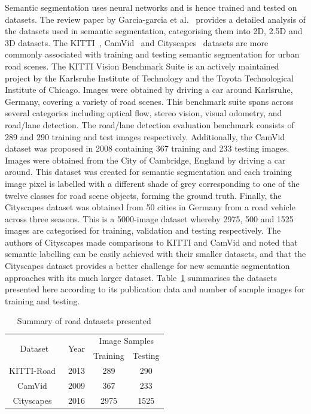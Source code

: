 Semantic segmentation uses neural networks and is hence trained and tested on datasets. The review paper by Garcia-garcia et al.~\cite{garcia-garcia_review_2017} provides a detailed analysis of the datasets used in semantic segmentation, categorising them into 2D, 2.5D and 3D datasets. The KITTI~\cite{geiger_are_2012}, CamVid~\cite{brostow_semantic_2009} and Cityscapes~\cite{cordts_cityscapes_2016} datasets are more commonly associated with training and testing semantic segmentation for urban road scenes. The KITTI Vision Benchmark Suite is an actively maintained project by the Karlsruhe Institute of Technology and the Toyota Technological Institute of Chicago. Images were obtained by driving a car around Karlsruhe, Germany, covering a variety of road scenes. This benchmark suite spans across several categories including optical flow, stereo vision, visual odometry, and road/lane detection. The road/lane detection evaluation benchmark consists of 289 and 290 training and test images respectively. Additionally, the CamVid dataset was proposed in 2008 containing 367 training and 233 testing images. Images were obtained from the City of Cambridge, England by driving a car around. This dataset was created for semantic segmentation and each training image pixel is labelled with a different shade of grey corresponding to one of the twelve classes for road scene objects, forming the ground truth. Finally, the Cityscapes dataset was obtained from 50 cities in Germany from a road vehicle across three seasons. This is a 5000-image dataset whereby 2975, 500 and 1525 images are categorised for training, validation and testing respectively. The authors of Cityscapes made comparisons to KITTI and CamVid and noted that semantic labelling can be easily achieved with their smaller datasets, and that the Cityscapes dataset provides a better challenge for new semantic segmentation approaches with its much larger dataset. Table~\ref{tabdatasets} summarises the datasets presented here according to its publication data and number of sample images for training and testing.

\begin{table}[H]
	\renewcommand{\arraystretch}{1.3}
	\caption{Summary of road datasets presented}
	\label{tabdatasets}
	\centering
	\begin{tabular}{c c c c}
		\toprule
		        \multirow{2}{*}{Dataset}         & \multirow{2}{*}{Year} & \multicolumn{2}{c}{Image Samples} \\
		             \cmidrule{3-4}              &                       & Training & Testing                \\ \midrule
		   KITTI-Road~\cite{geiger_are_2012}     & 2013                  & 289      & 290                    \\
		  CamVid~\cite{brostow_semantic_2009}    & 2009                  & 367      & 233                    \\
		Cityscapes~\cite{cordts_cityscapes_2016} & 2016                  & 2975     & 1525                   \\ \bottomrule
	\end{tabular}
\end{table}

